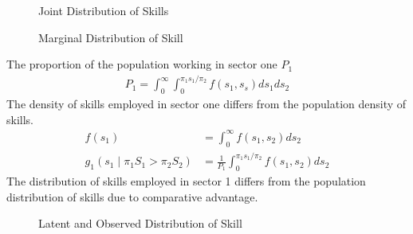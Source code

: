 \begin{frame}
	\begin{figure}[htp]\centering
		\caption{Joint Distribution of Skills}\label{Joint Distribution of Skills}
	\end{figure}
\end{frame}
\begin{frame}
	\begin{figure}[htp]\centering
		\caption{Marginal Distribution of Skill}\label{Marginal Distribution of Skill}
	\end{figure}
\end{frame}
\begin{frame}
	The proportion of the population working in sector one $P_1$
	\begin{align*}
	P_1 = \int^\infty_0 \int^{\pi_1 s_1 / \pi_2}_0 f(s_1, s_s) ds_1ds_2
	\end{align*}
	The density of skills employed in sector one differs from the population density of skills.
	\begin{align*}
	f(s_1) & = \int^\infty_0 f(s_1, s_2) ds_2 \\
	g_1(s_1 \mid \pi_1 S_1 > \pi_2 S_2) & = \frac{1}{P_1} \int^{\pi_1 s_1 /\pi_2}_0 f(s_1, s_2) ds_2
	\end{align*}
	The distribution of skills employed in sector 1 differs from the population distribution of skills due to comparative advantage.
\end{frame}
\begin{frame}
	\begin{figure}[htp]\centering
		\caption{Latent and Observed Distribution of Skill}\label{Latent and Observed Distribution of Skill}
	\end{figure}
\end{frame}
